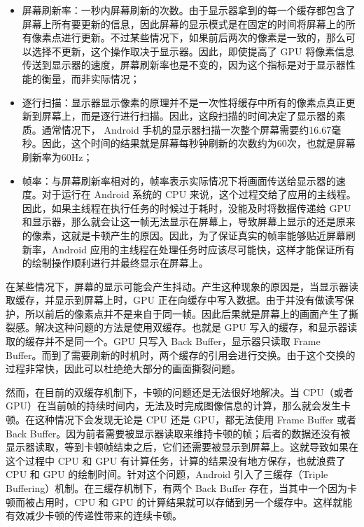 \begin{itemize}
    \item 屏幕刷新率：一秒内屏幕刷新的次数。由于显示器拿到的每一个缓存都包含了屏幕上所有要更新的信息，因此屏幕的显示模式是在固定的时间将屏幕上的所有像素点进行更新。不过某些情况下，如果前后两次的像素是一致的，那么可以选择不更新，这个操作取决于显示器。因此，即使提高了 GPU 将像素信息传送到显示器的速度，屏幕刷新率也是不变的，因为这个指标是对于显示器性能的衡量，而非实际情况；
    \item 逐行扫描：显示器显示像素的原理并不是一次性将缓存中所有的像素点真正更新到屏幕上，而是逐行进行扫描\cite{张春明2002显示器刷新率的测试以及逐行显示器的辨别方法}。因此，这段扫描的时间决定了显示器的素质。通常情况下， Android 手机的显示器扫描一次整个屏幕需要约16.67毫秒。因此，这个时间的结果就是屏幕每秒钟刷新的次数约为60次，也就是屏幕刷新率为60Hz；
    \item 帧率：与屏幕刷新率相对的，帧率表示实际情况下将画面传送给显示器的速度。对于运行在 Android 系统的 CPU 来说，这个过程交给了应用的主线程。因此，如果主线程在执行任务的时候过于耗时，没能及时将数据传递给 GPU 和显示器，那么就会让这一帧无法显示在屏幕上，导致屏幕上显示的还是原来的像素，这就是卡顿产生的原因。因此，为了保证真实的帧率能够贴近屏幕刷新率，Android 应用的主线程在处理任务时应该尽可能快，这样才能保证所有的绘制操作顺利进行并最终显示在屏幕上。
\end{itemize}

在某些情况下，屏幕的显示可能会产生抖动。产生这种现象的原因是，当显示器读取缓存，并显示到屏幕上时，GPU 正在向缓存中写入数据。由于并没有做读写保护，所以前后的像素点并不是来自于同一帧。因此后果就是屏幕上的画面产生了撕裂感\cite{yun2017reducing}。解决这种问题的方法是使用双缓存。也就是 GPU 写入的缓存，和显示器读取的缓存并不是同一个。GPU 只写入 Back Buffer，显示器只读取 Frame Buffer。而到了需要刷新的时机时，两个缓存的引用会进行交换。由于这个交换的过程非常快，因此可以杜绝绝大部分的画面撕裂问题。

然而，在目前的双缓存机制下，卡顿的问题还是无法很好地解决。当 CPU（或者 GPU）在当前帧的持续时间内，无法及时完成图像信息的计算，那么就会发生卡顿。在这种情况下会发现无论是 CPU 还是 GPU，都无法使用 Frame Buffer 或者 Back Buffer。因为前者需要被显示器读取来维持卡顿的帧；后者的数据还没有被显示器读取，等到卡顿帧结束之后，它们还需要被显示到屏幕上。这就导致如果在这个过程中 CPU 和 GPU 有计算任务，计算的结果没有地方保存，也就浪费了 CPU 和 GPU 的绘制时间。针对这个问题，Android 引入了三缓存（Triple Buffering）机制\cite{egilmez2017user}。在三缓存机制下，有两个 Back Buffer 存在，当其中一个因为卡顿而被占用时，CPU 和 GPU 的计算结果就可以存储到另一个缓存中。这样就能有效减少卡顿的传递性带来的连续卡顿。


